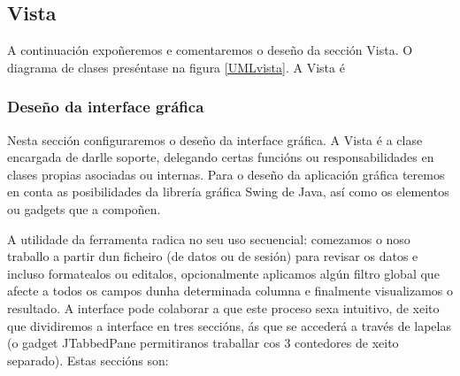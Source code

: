 \subsection{Vista}

A continuación expoñeremos e comentaremos o deseño da sección Vista. O diagrama de clases preséntase na figura \ref{UMLvista}. A Vista é

\subsubsection{Deseño da interface gráfica}

Nesta sección configuraremos o deseño da interface gráfica. A Vista é a clase encargada de darlle soporte, delegando certas funcións ou responsabilidades en clases propias asociadas ou internas. Para o deseño da aplicación gráfica teremos en conta as posibilidades da librería gráfica Swing de Java, así como os elementos ou gadgets que a compoñen. 

A utilidade da ferramenta radica no seu uso secuencial: comezamos o noso traballo a partir dun ficheiro (de datos ou de sesión) para revisar os datos e incluso formatealos ou editalos, opcionalmente aplicamos algún filtro global que afecte a todos os campos dunha determinada columna e finalmente visualizamos o resultado. A interface pode colaborar a que este proceso sexa intuitivo, de xeito que dividiremos a interface en tres seccións, ás que se accederá a través de lapelas (o gadget JTabbedPane permitiranos traballar cos 3 contedores de xeito separado). Estas seccións son:

